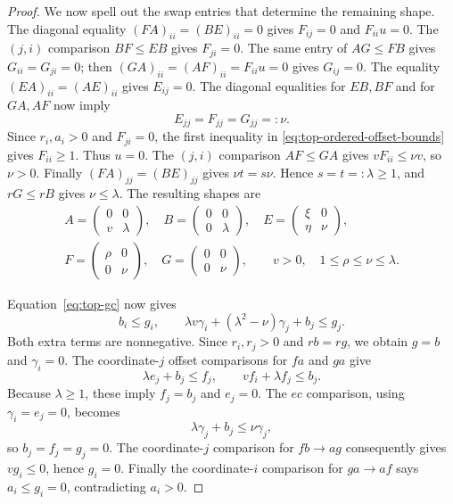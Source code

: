 \documentclass[11pt,a4paper]{article}
\begin{document}
\begin{proof}
We now spell out the swap entries that determine the remaining shape.
The diagonal equality $(FA)_{ii}=(BE)_{ii}=0$ gives
$F_{ij}=0$ and $F_{ii}u=0$.
The $(j,i)$ comparison $BF\le EB$ gives $F_{ji}=0$.
The same entry of $AG\le FB$ gives $G_{ii}=G_{ji}=0$;
then $(GA)_{ii}=(AF)_{ii}=F_{ii}u=0$ gives $G_{ij}=0$.
The equality $(EA)_{ii}=(AE)_{ii}$ gives $E_{ij}=0$.
The diagonal equalities for $EB,BF$ and for $GA,AF$ now imply
\[
E_{jj}=F_{jj}=G_{jj}=:\nu.
\]
Since $r_i,a_i>0$ and $F_{ji}=0$, the first inequality in
\eqref{eq:top-ordered-offset-bounds} gives $F_{ii}\ge1$.
Thus $u=0$. The $(j,i)$ comparison $AF\le GA$ gives
$vF_{ii}\le\nu v$, so $\nu>0$.
Finally $(FA)_{jj}=(BE)_{jj}$ gives $\nu t=s\nu$.
Hence $s=t=:\lambda\ge1$, and $rG\le rB$ gives $\nu\le\lambda$.
The resulting shapes are
\begin{equation}\label{eq:top-ordered-shapes}
\begin{gathered}
A=\begin{pmatrix}0&0\\v&\lambda\end{pmatrix},\quad
B=\begin{pmatrix}0&0\\0&\lambda\end{pmatrix},\quad
E=\begin{pmatrix}\xi&0\\\eta&\nu\end{pmatrix},\\
F=\begin{pmatrix}\rho&0\\0&\nu\end{pmatrix},\quad
G=\begin{pmatrix}0&0\\0&\nu\end{pmatrix},\qquad
v>0,\quad 1\le\rho\le\nu\le\lambda.
\end{gathered}
\end{equation}

Equation~\eqref{eq:top-gc} now gives
\[
b_i\le g_i,\qquad
\lambda v\gamma_i+(\lambda^2-\nu)\gamma_j+b_j\le g_j.
\]
Both extra terms are nonnegative. Since $r_i,r_j>0$ and $rb=rg$,
we obtain $g=b$ and $\gamma_i=0$.
The coordinate-$j$ offset comparisons for $fa$ and $ga$ give
\[
\lambda e_j+b_j\le f_j,\qquad vf_i+\lambda f_j\le b_j.
\]
Because $\lambda\ge1$, these imply $f_j=b_j$ and $e_j=0$.
The $ec$ comparison, using $\gamma_i=e_j=0$, becomes
\[
\lambda\gamma_j+b_j\le\nu\gamma_j,
\]
so $b_j=f_j=g_j=0$.
The coordinate-$j$ comparison for $fb\to ag$ consequently gives
$vg_i\le0$, hence $g_i=0$.
Finally the coordinate-$i$ comparison for $ga\to af$ says
$a_i\le g_i=0$, contradicting $a_i>0$.
\end{proof}
\end{document}
